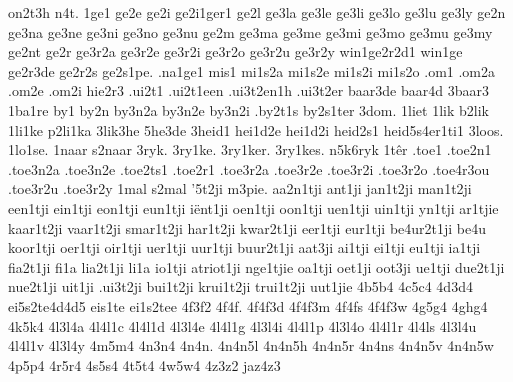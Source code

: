 {%
on2t3h
n4t.
%
1ge1
ge2e
ge2i
ge2i1ger1
ge2l
ge3la
ge3le
ge3li
ge3lo
ge3lu
ge3ly
ge2n
ge3na
ge3ne
ge3ni
ge3no
ge3nu
ge2m
ge3ma
ge3me
ge3mi
ge3mo
ge3mu
ge3my
%
ge2nt
%
ge2r
ge3r2a
ge3r2e
ge3r2i
ge3r2o
ge3r2u
ge3r2y
win1ge2r2d1
win1ge
ge2r3de
ge2r2s
ge2s1pe.
%
.na1ge1
%
mis1
mi1s2a
mi1s2e
mi1s2i
mi1s2o
.om1
.om2a
.om2e
.om2i
hie2r3
.ui2t1
.ui2t1een
.ui3t2en1h
.ui3t2er
%
%
baar3de
baar4d
3baar3
1ba1re
by1
by2n
by3n2a
by3n2e
by3n2i
.by2t1s
by2s1ter
3dom.
1liet
1lik
b2lik
1li1ke
p2li1ka
3lik3he
5he3de
3heid1
hei1d2e
hei1d2i
heid2s1
heid5s4er1ti1
3loos.
1lo1se.
1naar
s2naar
3ryk.
3ry1ke.
3ry1ker.
3ry1kes.
n5k6ryk
%
%
1têr
%
.toe1
.toe2n1
.toe3n2a
.toe3n2e
.toe2ts1
%
.toe2r1
.toe3r2a
.toe3r2e
.toe3r2i
.toe3r2o
.toe4r3ou
.toe3r2u
.toe3r2y
%
1mal
s2mal
%
%
'5t2ji
m3pie.
%
%
aa2n1tji
ant1ji
jan1t2ji
man1t2ji
een1tji
ein1tji
eon1tji
eun1tji
iënt1ji
oen1tji
oon1tji
uen1tji
uin1tji
yn1tji
%
ar1tjie
kaar1t2ji
vaar1t2ji
smar1t2ji
har1t2ji
kwar2t1ji
eer1tji
eur1tji
be4ur2t1ji
be4u
koor1tji
oer1tji
oir1tji
uer1tji
uur1tji
buur2t1ji
%
aat3ji
ai1tji
ei1tji
eu1tji
ia1tji
fia2t1ji
fi1a
lia2t1ji
li1a
io1tji
atriot1ji
nge1tjie
oa1tji
oet1ji
oot3ji
ue1tji
due2t1ji
nue2t1ji
uit1ji
.ui3t2ji
bui1t2ji
krui1t2ji
trui1t2ji
uut1jie
%
%
%
4b5b4
4c5c4
4d3d4
ei5s2te4d4d5
eis1te
ei1s2tee
4f3f2
4f4f.
4f4f3d
4f4f3m
4f4fs
4f4f3w
4g5g4
4ghg4
4k5k4
4l3l4a
4l4l1c
4l4l1d
4l3l4e
4l4l1g
4l3l4i
4l4l1p
4l3l4o
4l4l1r
4l4ls
4l3l4u
4l4l1v
4l3l4y
4m5m4
4n3n4
4n4n.
4n4n5l
4n4n5h
4n4n5r
4n4ns
4n4n5v
4n4n5w
4p5p4
4r5r4
4s5s4
4t5t4
4w5w4
4z3z2
jaz4z3
%
}
